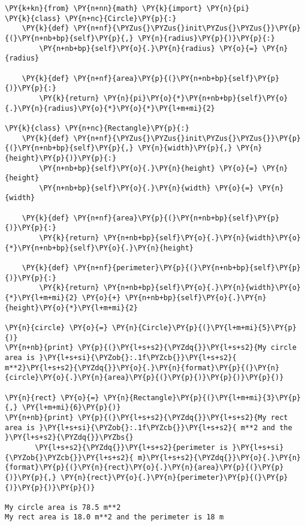 \begin{Answer}
\begin{tcolorbox}[size=fbox, boxrule=1pt, colback=cellbackground, colframe=cellborder]
\begin{Verbatim}[commandchars=\\\{\}]
\PY{k+kn}{from} \PY{n+nn}{math} \PY{k}{import} \PY{n}{pi}     
\PY{k}{class} \PY{n+nc}{Circle}\PY{p}{:}
    \PY{k}{def} \PY{n+nf}{\PYZus{}\PYZus{}init\PYZus{}\PYZus{}}\PY{p}{(}\PY{n+nb+bp}{self}\PY{p}{,} \PY{n}{radius}\PY{p}{)}\PY{p}{:}
        \PY{n+nb+bp}{self}\PY{o}{.}\PY{n}{radius} \PY{o}{=} \PY{n}{radius}

    \PY{k}{def} \PY{n+nf}{area}\PY{p}{(}\PY{n+nb+bp}{self}\PY{p}{)}\PY{p}{:}
        \PY{k}{return} \PY{n}{pi}\PY{o}{*}\PY{n+nb+bp}{self}\PY{o}{.}\PY{n}{radius}\PY{o}{*}\PY{o}{*}\PY{l+m+mi}{2}

\PY{k}{class} \PY{n+nc}{Rectangle}\PY{p}{:}
    \PY{k}{def} \PY{n+nf}{\PYZus{}\PYZus{}init\PYZus{}\PYZus{}}\PY{p}{(}\PY{n+nb+bp}{self}\PY{p}{,} \PY{n}{width}\PY{p}{,} \PY{n}{height}\PY{p}{)}\PY{p}{:}
        \PY{n+nb+bp}{self}\PY{o}{.}\PY{n}{height} \PY{o}{=} \PY{n}{height}
        \PY{n+nb+bp}{self}\PY{o}{.}\PY{n}{width} \PY{o}{=} \PY{n}{width}

    \PY{k}{def} \PY{n+nf}{area}\PY{p}{(}\PY{n+nb+bp}{self}\PY{p}{)}\PY{p}{:}
        \PY{k}{return} \PY{n+nb+bp}{self}\PY{o}{.}\PY{n}{width}\PY{o}{*}\PY{n+nb+bp}{self}\PY{o}{.}\PY{n}{height}

    \PY{k}{def} \PY{n+nf}{perimeter}\PY{p}{(}\PY{n+nb+bp}{self}\PY{p}{)}\PY{p}{:}
        \PY{k}{return} \PY{n+nb+bp}{self}\PY{o}{.}\PY{n}{width}\PY{o}{*}\PY{l+m+mi}{2} \PY{o}{+} \PY{n+nb+bp}{self}\PY{o}{.}\PY{n}{height}\PY{o}{*}\PY{l+m+mi}{2}

\PY{n}{circle} \PY{o}{=} \PY{n}{Circle}\PY{p}{(}\PY{l+m+mi}{5}\PY{p}{)}
\PY{n+nb}{print} \PY{p}{(}\PY{l+s+s2}{\PYZdq{}}\PY{l+s+s2}{My circle area is }\PY{l+s+si}{\PYZob{}:.1f\PYZcb{}}\PY{l+s+s2}{ m**2}\PY{l+s+s2}{\PYZdq{}}\PY{o}{.}\PY{n}{format}\PY{p}{(}\PY{n}{circle}\PY{o}{.}\PY{n}{area}\PY{p}{(}\PY{p}{)}\PY{p}{)}\PY{p}{)}

\PY{n}{rect} \PY{o}{=} \PY{n}{Rectangle}\PY{p}{(}\PY{l+m+mi}{3}\PY{p}{,} \PY{l+m+mi}{6}\PY{p}{)}
\PY{n+nb}{print} \PY{p}{(}\PY{l+s+s2}{\PYZdq{}}\PY{l+s+s2}{My rect area is }\PY{l+s+si}{\PYZob{}:.1f\PYZcb{}}\PY{l+s+s2}{ m**2 and the }\PY{l+s+s2}{\PYZdq{}}\PYZbs{}
       \PY{l+s+s2}{\PYZdq{}}\PY{l+s+s2}{perimeter is }\PY{l+s+si}{\PYZob{}\PYZcb{}}\PY{l+s+s2}{ m}\PY{l+s+s2}{\PYZdq{}}\PY{o}{.}\PY{n}{format}\PY{p}{(}\PY{n}{rect}\PY{o}{.}\PY{n}{area}\PY{p}{(}\PY{p}{)}\PY{p}{,} \PY{n}{rect}\PY{o}{.}\PY{n}{perimeter}\PY{p}{(}\PY{p}{)}\PY{p}{)}\PY{p}{)}

My circle area is 78.5 m**2
My rect area is 18.0 m**2 and the perimeter is 18 m
\end{Verbatim}
\end{tcolorbox}
\end{Answer}

